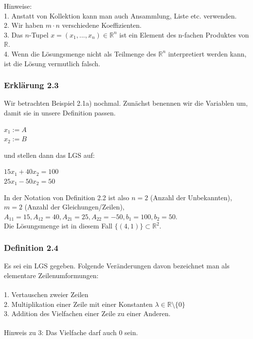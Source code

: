 \documentclass{article}
\begin{document}
Hinweise: \\
1. Anstatt von Kollektion kann man auch Ansammlung, Liste etc. verwenden. \\
2. Wir haben $m \cdot n$ verschiedene Koeffizienten. \\
3. Das $n$-Tupel $x = (x_1, ..., x_n) \in \mathbb{R}^n$ ist ein Element des n-fachen Produktes von $\mathbb{R}$. \\
4. Wenn die Lösungsmenge nicht als Teilmenge des $\mathbb{R}^n$ interpretiert werden kann, ist die Lösung vermutlich falsch. \\

\subsubsection*{Erklärung 2.3}
Wir betrachten Beispiel 2.1a) nochmal. Zunächst benennen wir die Variablen um, damit sie in unsere Definition passen. \\
\begin{center}
    $x_1 := A$ \\
    $x_2 := B$ \\
\end{center}
und stellen dann das LGS auf: 
\begin{center}
    $15x_1 + 40x_2 = 100$ \\
    $25x_1 - 50x_2 = 50$ \\
\end{center}
In der Notation von Definition 2.2 ist also $n = 2$ (Anzahl der Unbekannten), $m = 2$ (Anzahl der Gleichungen/Zeilen), $A_{11} = 15, A_{12} = 40, A_{21} = 25, A_{22} = -50, b_1 = 100, b_2 = 50$. \\
Die Lösungsmenge ist in diesem Fall $\{(4, 1)\} \subset \mathbb{R}^2$. \\

\subsubsection*{Definition 2.4}
Es sei ein LGS gegeben. Folgende Veränderungen davon bezeichnet man als elementare Zeilenumformungen: \\
\\
1. Vertauschen zweier Zeilen \\
2. Multiplikation einer Zeile mit einer Konstanten $\lambda \in \mathbb{R} \setminus \{0\}$ \\
3. Addition des Vielfachen einer Zeile zu einer Anderen. \\
\\
Hinweis zu 3: Das Vielfache darf auch 0 sein. \\
\end{document}

